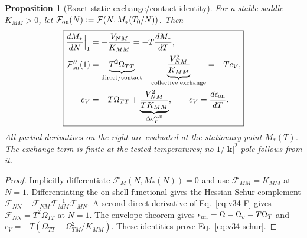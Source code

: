 \documentclass[11pt,a4paper]{article}
\newtheorem{proposition}[theorem]{Proposition}
\theoremstyle{remark}\newtheorem{remark}[theorem]{Remark}
\begin{document}
\begin{proposition}[Exact static exchange/contact identity]
\label{prop:v34-schur}
For a stable saddle $K_{MM}>0$, let $\mathcal F_{\rm on}(N)
:=\mathcal F(N,M_*(T_0/N))$. Then
\begin{equation}\label{eq:v34-schur}
\boxed{\begin{aligned}
\frac{dM_*}{dN}\Big|_1&=-\frac{V_{NM}}{K_{MM}}
=-T\frac{dM_*}{dT},\\
\mathcal F_{\rm on}''(1)&=\underbrace{T^2\Omega_{TT}}
_{\text{direct/contact}}-\underbrace{\frac{V_{NM}^2}{K_{MM}}}
_{\text{collective exchange}}=-T c_V,\\
c_V&=-T\Omega_{TT}
+\underbrace{\frac{V_{NM}^2}{T K_{MM}}}_{\Delta c_V^{\rm coll}},
\qquad c_V=\frac{d\epsilon_{\rm on}}{dT}.
\end{aligned}}
\end{equation}
All partial derivatives on the right are evaluated at the stationary
point $M_*(T)$. The exchange term is finite at the tested temperatures;
no $1/|\mathbf k|^2$ pole follows from it.
\end{proposition}
\begin{proof}
Implicitly differentiate $\mathcal F_M(N,M_*(N))=0$ and use
$\mathcal F_{MM}=K_{MM}$ at $N=1$. Differentiating the on-shell
functional gives the Hessian Schur complement
$\mathcal F_{NN}-\mathcal F_{NM}\mathcal F_{MM}^{-1}\mathcal F_{MN}$.
A second direct derivative of Eq.~\eqref{eq:v34-F} gives
$\mathcal F_{NN}=T^2\Omega_{TT}$ at $N=1$. The envelope theorem gives
$\epsilon_{\rm on}=\Omega-\Omega_v-T\Omega_T$ and
$c_V=-T(\Omega_{TT}-\Omega_{TM}^2/K_{MM})$.
These identities prove Eq.~\eqref{eq:v34-schur}.
\end{proof}
\end{document}
